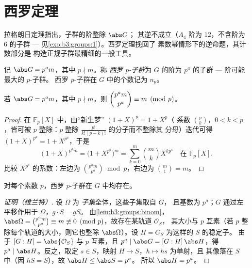 \section{西罗定理}

拉格朗日定理指出，子群的阶整除 $\abs G$；
其逆不成立（$A_4$ 阶为 $12$，不含阶为
$6$ 的子群 --- 见\cref{exo:b3:groups:1}）。西罗定理挽回了
素数幂情形下的逆命题，其计数部分是
构造正规子群最精细的一般工具。

\begin{definition}\label{def:b3:groups:sylow}
记 $\abs G = p^a m$，其中 $p \nmid m$。称 \emph{西罗
$p$-子群}为 $G$ 的阶为
$p^a$ 的子群 --- 阶可能最大的 $p$-子群。
西罗 $p$-子群在 $G$ 中的个数记为 $n_p$。
\end{definition}

\begin{lemma}\label{lem:b3:groups:binom}
若 $\abs G = p^a m$，其中 $p \nmid m$，则 $\dbinom{p^a m}{p^a}
\equiv m \pmod p$。
\end{lemma}

\begin{proof}
在 $\mathbb F_p[X]$ 中，由“新生梦” $(1+X)^p = 1 + X^p$（
系数 $\binom pk$，$0<k<p$，皆可被 $p$ 整除：$p$
整除 $\frac{p!}{k!(p-k)!}$ 的分子而不整除其
分母）迭代可得 $(1+X)^{p^a} = 1 + X^{p^a}$，于是
\[
(1+X)^{p^a m} = \bigl(1 + X^{p^a}\bigr)^m
= \sum_{k=0}^{m} \binom mk X^{k p^a} \quad\text{在 } \mathbb
F_p[X].
\]
比较 $X^{p^a}$ 的系数：左边为 $\binom{p^a
m}{p^a} \bmod p$，右边为 $\binom m1 = m$。
\end{proof}

\begin{theorem}[西罗 I：存在性]\label{thm:b3:groups:sylow1}
对每个素数 $p$，西罗 $p$-子群在 $G$ 中均存在。
\end{theorem}

\begin{proof}[证明（维兰特）]
设 $\Omega$ 为 \emph{子集}全体，这些子集取自 $G$，
且基数为 $p^a$；$G$ 通过左平移作用于 $\Omega$，$g \cdot S = gS$。
由\cref{lem:b3:groups:binom}，$\abs\Omega = \binom{p^a m}{p^a}
\equiv m \not\equiv 0 \pmod p$，故存在某轨道 $\mathcal O_S$，
其大小与 $p$ 互素（若 $p$ 整除每个轨道的大小，则它也整除
$\abs\Omega$）。设 $H = G_S$ 为这样的 $S$ 的稳定子。
由于 $[G : H] = \abs{\mathcal O_S}$ 与 $p$ 互素，且 $p^a \mid
\abs G = [G:H]\,\abs H$，得 $p^a \mid \abs H$。反之，取定
$s \in S$，映射 $H \to S$，$h \mapsto hs$ 为单射，且
其像落在 $S$ 中（因 $hS = S$），故 $\abs H \leq \abs S = p^a$。
所以 $\abs H = p^a$。
\end{proof}

